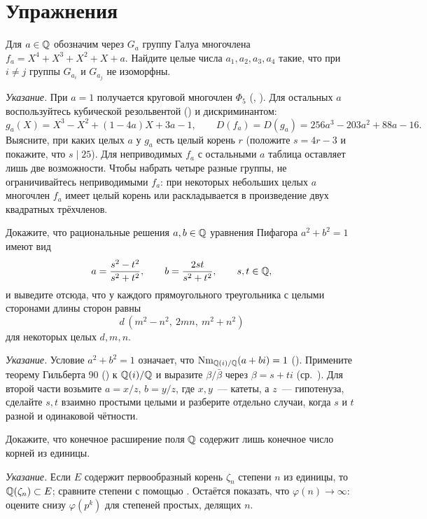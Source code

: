 \section*{Упражнения}

\begin{exercise}[5-1]
Для $a\in\mathbb Q$ обозначим через $G_a$ группу Галуа многочлена $f_a=X^4+X^3+X^2+X+a$. Найдите целые числа
$a_1,a_2,a_3,a_4$ такие, что при $i\ne j$ группы $G_{a_i}$ и $G_{a_j}$ не изоморфны.

\emph{Указание.} При $a=1$ получается круговой многочлен $\Phi_5$ (, ). Для остальных $a$ воспользуйтесь
кубической резольвентой () и дискриминантом:
\[
g_a(X)=X^3-X^2+(1-4a)X+3a-1,\qquad D(f_a)=D(g_a)=256a^3-203a^2+88a-16 .
\]
Выясните, при каких целых $a$ у $g_a$ есть целый корень $r$ (положите $s=4r-3$ и покажите, что $s\mid25$). Для
неприводимых $f_a$ с остальными $a$ таблица  оставляет лишь две возможности. Чтобы набрать четыре разные
группы, не ограничивайтесь неприводимыми $f_a$: при некоторых небольших целых $a$ многочлен $f_a$ имеет целый корень
или раскладывается в произведение двух квадратных трёхчленов.
\end{exercise}

\begin{exercise}[5-2]
Докажите, что рациональные решения $a,b\in\mathbb Q$ уравнения Пифагора $a^2+b^2=1$ имеют вид
\[
a=\frac{s^2-t^2}{s^2+t^2},\qquad b=\frac{2st}{s^2+t^2},\qquad s,t\in\mathbb Q,
\]
и выведите отсюда, что у каждого прямоугольного треугольника с целыми сторонами длины сторон равны
\[
d\,(m^2-n^2,\ 2mn,\ m^2+n^2)
\]
для некоторых целых $d,m,n$.

\emph{Указание.} Условие $a^2+b^2=1$ означает, что $\operatorname{Nm}_{\mathbb Q(i)/\mathbb Q}(a+bi)=1$ (). Примените теорему Гильберта 90
() к $\mathbb Q(i)/\mathbb Q$ и выразите $\beta/\bar\beta$ через $\beta=s+ti$ (ср.\ ). Для второй части возьмите $a=x/z$,
$b=y/z$, где $x,y$~--- катеты, а $z$~--- гипотенуза, сделайте $s,t$ взаимно простыми целыми и разберите отдельно
случаи, когда $s$ и $t$ разной и одинаковой чётности.
\end{exercise}

\begin{exercise}[5-3]
Докажите, что конечное расширение поля $\mathbb Q$ содержит лишь конечное число корней из единицы.

\emph{Указание.} Если $E$ содержит первообразный корень $\zeta_n$ степени $n$ из единицы, то $\mathbb Q(\zeta_n)\subset E$;
сравните степени с помощью . Остаётся показать, что $\varphi(n)\to\infty$: оцените снизу $\varphi(p^k)$ для
степеней простых, делящих $n$.
\end{exercise}

